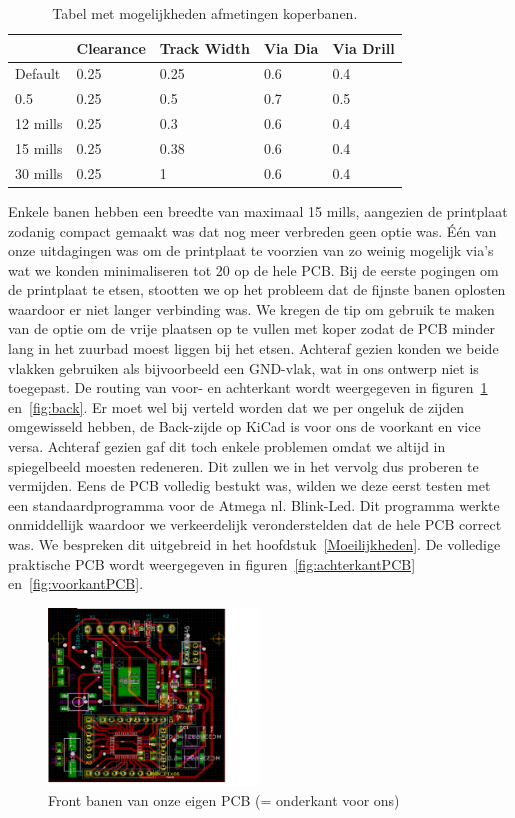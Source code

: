\begin {table}[H]
\caption {Tabel met mogelijkheden afmetingen koperbanen.} \label{table:afmetingen}
	\begin{center}
	\begin{tabular}{ | l | l | l | l | l |}
	\hline
	  & Clearance & Track Width & Via Dia & Via Drill\\ \hline
	Default & 0.25 & 0.25 & 0.6 & 0.4\\ \hline
	0.5 & 0.25 & 0.5 & 0.7 & 0.5 \\ \hline
	12 mills & 0.25 & 0.3 & 0.6 & 0.4 \\ \hline
	15 mills & 0.25 & 0.38 & 0.6 & 0.4 \\ \hline
	30 mills & 0.25 & 1 & 0.6 & 0.4 \\ \hline
	\end{tabular}
	\end{center}
\end{table}
 Enkele banen hebben een breedte van maximaal 15 mills, aangezien de printplaat zodanig compact gemaakt was dat nog meer verbreden geen optie was. \'E\'en van onze uitdagingen was om de printplaat te voorzien van zo weinig mogelijk via's wat we konden minimaliseren tot 20 op de hele PCB. Bij de  eerste pogingen om de printplaat te etsen, stootten we op het probleem dat de fijnste banen oplosten waardoor er niet langer verbinding was. We kregen de tip om gebruik te maken van de optie om de vrije plaatsen op te vullen met koper zodat de PCB minder lang in het zuurbad moest liggen bij het etsen. Achteraf gezien konden we beide vlakken gebruiken als bijvoorbeeld een GND-vlak, wat in ons ontwerp niet is toegepast. De routing van voor- en achterkant wordt weergegeven in figuren~\ref{fig:front} en~\ref{fig:back}. Er moet wel bij verteld worden dat we per ongeluk de zijden omgewisseld hebben, de Back-zijde op KiCad is voor ons de voorkant en vice versa. Achteraf gezien gaf dit toch enkele problemen omdat we altijd in spiegelbeeld moesten redeneren. Dit zullen we in het vervolg dus proberen te vermijden. Eens de PCB volledig bestukt was, wilden we deze eerst testen met een standaardprogramma voor de Atmega nl. Blink-Led. Dit programma werkte onmiddellijk waardoor we verkeerdelijk veronderstelden dat de hele PCB correct was. We bespreken dit uitgebreid in het hoofdstuk~\ref{Moeilijkheden}. De volledige praktische PCB wordt weergegeven in figuren~\ref{fig:achterkantPCB} en~\ref{fig:voorkantPCB}. 
\begin{figure}[h]
\centering
\includegraphics[width=0.5\textwidth]{Front.png}
\caption{Front banen van onze eigen PCB (= onderkant voor ons)}
\label{fig:front}
\end{figure}

